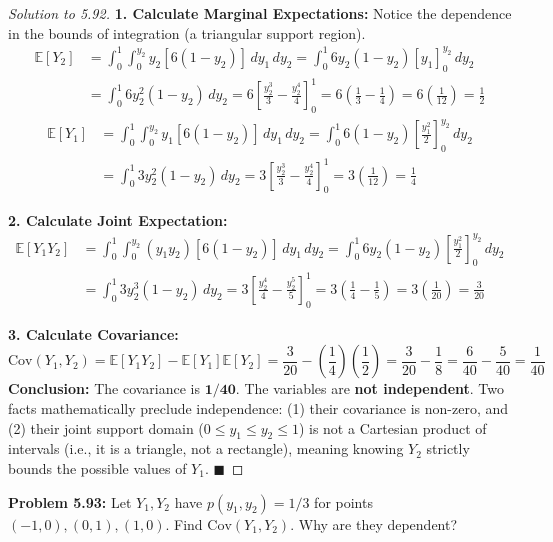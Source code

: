 \documentclass[11pt, a4paper]{article}
\theoremstyle{definition}
\theoremstyle{remark}
\newcommand{\E}{\mathbb{E}}
\newcommand{\Cov}{\mathrm{Cov}}
\begin{document}
\begin{proof}[Solution to 5.92]
\textbf{1. Calculate Marginal Expectations:}
Notice the dependence in the bounds of integration (a triangular support region).
\begin{align*}
\E[Y_2] &= \int_{0}^{1} \int_{0}^{y_2} y_2 [6(1-y_2)] \,dy_1 \,dy_2 = \int_{0}^{1} 6y_2(1-y_2) \left[ y_1 \right]_0^{y_2} \,dy_2 \\
&= \int_{0}^{1} 6y_2^2(1-y_2) \,dy_2 = 6 \left[ \frac{y_2^3}{3} - \frac{y_2^4}{4} \right]_0^1 = 6\left(\frac{1}{3} - \frac{1}{4}\right) = 6\left(\frac{1}{12}\right) = \frac{1}{2}
\end{align*}
\begin{align*}
\E[Y_1] &= \int_{0}^{1} \int_{0}^{y_2} y_1 [6(1-y_2)] \,dy_1 \,dy_2 = \int_{0}^{1} 6(1-y_2) \left[ \frac{y_1^2}{2} \right]_0^{y_2} \,dy_2 \\
&= \int_{0}^{1} 3y_2^2(1-y_2) \,dy_2 = 3 \left[ \frac{y_2^3}{3} - \frac{y_2^4}{4} \right]_0^1 = 3\left(\frac{1}{12}\right) = \frac{1}{4}
\end{align*}

\textbf{2. Calculate Joint Expectation:}
\begin{align*}
\E[Y_1 Y_2] &= \int_{0}^{1} \int_{0}^{y_2} (y_1 y_2) [6(1-y_2)] \,dy_1 \,dy_2 = \int_{0}^{1} 6y_2(1-y_2) \left[ \frac{y_1^2}{2} \right]_0^{y_2} \,dy_2 \\
&= \int_{0}^{1} 3y_2^3(1-y_2) \,dy_2 = 3 \left[ \frac{y_2^4}{4} - \frac{y_2^5}{5} \right]_0^1 = 3\left(\frac{1}{4} - \frac{1}{5}\right) = 3\left(\frac{1}{20}\right) = \frac{3}{20}
\end{align*}

\textbf{3. Calculate Covariance:}
\[
\Cov(Y_1, Y_2) = \E[Y_1 Y_2] - \E[Y_1]\E[Y_2] = \frac{3}{20} - \left(\frac{1}{4}\right)\left(\frac{1}{2}\right) = \frac{3}{20} - \frac{1}{8} = \frac{6}{40} - \frac{5}{40} = \frac{1}{40}
\]
\textbf{Conclusion:} The covariance is $\mathbf{1/40}$. The variables are \textbf{not independent}. Two facts mathematically preclude independence: (1) their covariance is non-zero, and (2) their joint support domain ($0 \le y_1 \le y_2 \le 1$) is not a Cartesian product of intervals (i.e., it is a triangle, not a rectangle), meaning knowing $Y_2$ strictly bounds the possible values of $Y_1$. $\blacksquare$
\end{proof}

\vspace{1em}
\noindent\textbf{Problem 5.93:} Let $Y_1, Y_2$ have $p(y_1, y_2) = 1/3$ for points $(-1,0), (0,1), (1,0)$. Find $\Cov(Y_1, Y_2)$. Why are they dependent?
\end{document}
